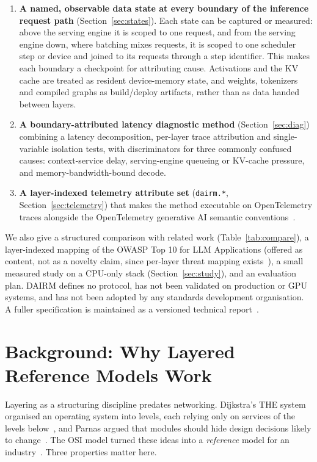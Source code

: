 \documentclass[11pt]{article}
\begin{document}
\begin{enumerate}[leftmargin=*,itemsep=2pt]
  \item \textbf{A named, observable data state at every boundary of the inference request path} (Section~\ref{sec:states}). Each state can be captured or measured: above the serving engine it is scoped to one request, and from the serving engine down, where batching mixes requests, it is scoped to one scheduler step or device and joined to its requests through a step identifier. This makes each boundary a checkpoint for attributing cause. Activations and the KV cache are treated as resident device-memory state, and weights, tokenizers and compiled graphs as build/deploy artifacts, rather than as data handed between layers.
  \item \textbf{A boundary-attributed latency diagnostic method} (Section~\ref{sec:diag}) combining a latency decomposition, per-layer trace attribution and single-variable isolation tests, with discriminators for three commonly confused causes: context-service delay, serving-engine queueing or KV-cache pressure, and memory-bandwidth-bound decode.
  \item \textbf{A layer-indexed telemetry attribute set} (\texttt{dairm.*}, Section~\ref{sec:telemetry}) that makes the method executable on OpenTelemetry traces alongside the OpenTelemetry generative AI semantic conventions~\cite{otelgenai}.
\end{enumerate}

\noindent We also give a structured comparison with related work (Table~\ref{tab:compare}), a layer-indexed mapping of the OWASP Top 10 for LLM Applications (offered as content, not as a novelty claim, since per-layer threat mapping exists~\cite{huang2025maestro}), a small measured study on a CPU-only stack (Section~\ref{sec:study}), and an evaluation plan. DAIRM defines no protocol, has not been validated on production or GPU systems, and has not been adopted by any standards development organisation. A fuller specification is maintained as a versioned technical report~\cite{bhatt2026dairm}.

\section{Background: Why Layered Reference Models Work}
\label{sec:background}

Layering as a structuring discipline predates networking. Dijkstra's THE system organised an operating system into levels, each relying only on services of the levels below~\cite{dijkstra1968the}, and Parnas argued that modules should hide design decisions likely to change~\cite{parnas1972criteria}. The OSI model turned these ideas into a \emph{reference} model for an industry~\cite{zimmermann1980osi,iso7498}. Three properties matter here.
\end{document}
